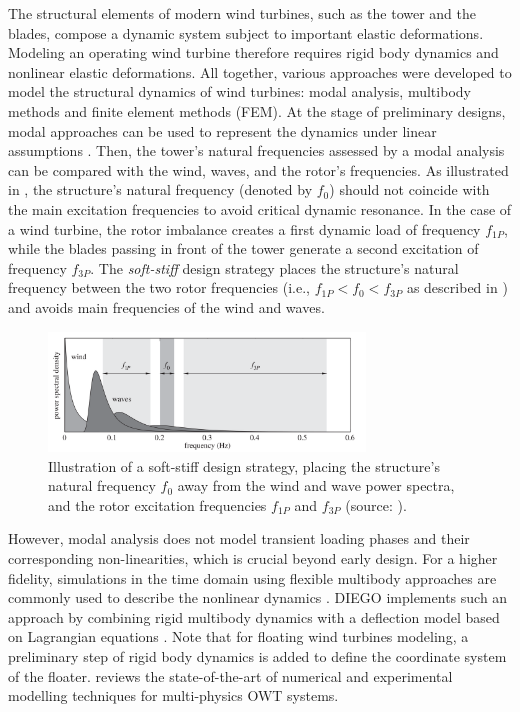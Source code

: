 The structural elements of modern wind turbines, such as the tower and the blades, compose a dynamic system subject to important elastic deformations. 
Modeling an operating wind turbine therefore requires rigid body dynamics and nonlinear elastic deformations. 
All together, various approaches were developed to model the structural dynamics of wind turbines: modal analysis, multibody methods and finite element methods (FEM). 
At the stage of preliminary designs, modal approaches can be used to represent the dynamics under linear assumptions \citep{hegseth_2019_modal_FOWT}. 
Then, the tower's natural frequencies assessed by a modal analysis can be compared with the wind, waves, and the rotor's frequencies. 
As illustrated in , the structure's natural frequency (denoted by $f_0$) should not coincide with the main excitation frequencies to avoid critical dynamic resonance.
In the case of a wind turbine, the rotor imbalance creates a first dynamic load of frequency $f_{1P}$, while the blades passing in front of the tower generate a second excitation of frequency $f_{3P}$.  
The \textit{soft-stiff} design strategy places the structure's natural frequency between the two rotor frequencies (i.e., $f_{1P} < f_0 < f_{3P}$ as described in ) and avoids main frequencies of the wind and waves. 
\begin{figure}
    \centering
    \includegraphics[width=0.75\textwidth]{./part1/figures/modal_analysis.png}
    \caption{Illustration of a soft-stiff design strategy, placing the structure's natural frequency $f_0$ away from the wind and wave power spectra, and the rotor excitation frequencies $f_{1P}$ and $f_{3P}$ (source: \citealt{kallehave_2015_modal}).}
    \label{fig:modal_analysis}
\end{figure}

However, modal analysis does not model transient loading phases and their corresponding non-linearities, which is crucial beyond early design. 
For a higher fidelity, simulations in the time domain using flexible multibody approaches are commonly used to describe the nonlinear dynamics \citep{holm_2009_multibody,alsolihat_2018_flexible_multibody}. 
DIEGO implements such an approach by combining rigid multibody dynamics with a deflection model based on Lagrangian equations \citep{milano_thesis_2021}. 
Note that for floating wind turbines modeling, a preliminary step of rigid body dynamics is added to define the coordinate system of the floater. 
\citet{otter_2022_owt_modeling_review} reviews the state-of-the-art of numerical and experimental modelling techniques for multi-physics OWT systems. 


